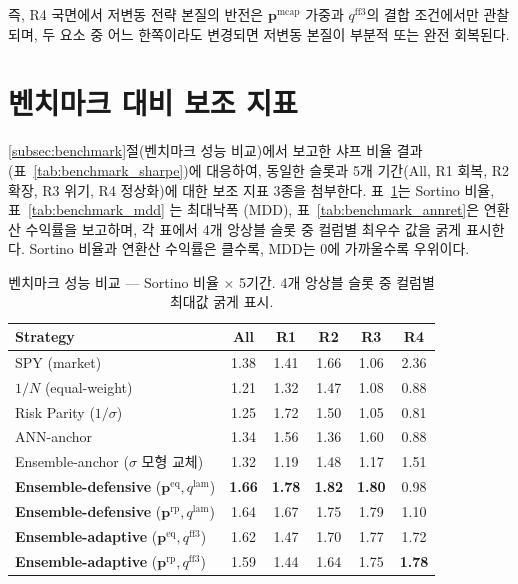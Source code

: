 \documentclass[eng]{kjas3}
\begin{document}
즉, R4 국면에서 저변동 전략 본질의 반전은 $\mathbf{p}^{\mathrm{mcap}}$ 가중과 $q^{\mathrm{ff3}}$의 결합 조건에서만 관찰되며, 두 요소 중 어느 한쪽이라도 변경되면 저변동 본질이 부분적 또는 완전 회복된다.

\section{벤치마크 대비 보조 지표}\label{app:benchmark}

\ref{subsec:benchmark}절(벤치마크 성능 비교)에서 보고한 샤프 비율 결과(표~\ref{tab:benchmark_sharpe})에 대응하여, 동일한 슬롯과 5개 기간(All, R1 회복, R2 확장, R3 위기, R4 정상화)에 대한 보조 지표 3종을 첨부한다.  표~\ref{tab:benchmark_sortino}는 Sortino 비율, 표~\ref{tab:benchmark_mdd} 는 최대낙폭 (MDD), 표~\ref{tab:benchmark_annret}은 연환산 수익률을 보고하며, 각 표에서 4개 앙상블 슬롯 중 컬럼별 최우수 값을 굵게 표시한다. Sortino 비율과 연환산 수익률은 클수록, MDD는 0에 가까울수록 우위이다.

\begin{table}[t]
\centering
\caption{벤치마크 성능 비교 — Sortino 비율 $\times$ 5기간. 4개 앙상블 슬롯 중 컬럼별 최대값 굵게 표시.}
\label{tab:benchmark_sortino}
\setlength{\tabcolsep}{6pt}
\renewcommand{\arraystretch}{1.15}
\small
\begin{tabular}{lccccc}
\toprule
Strategy & All & R1 & R2 & R3 & R4 \\
\midrule
SPY (market)                       & 1.38 & 1.41 & 1.66 & 1.06 & 2.36 \\
$1/N$ (equal-weight)               & 1.21 & 1.32 & 1.47 & 1.08 & 0.88 \\
Risk Parity ($1/\sigma$)           & 1.25 & 1.72 & 1.50 & 1.05 & 0.81 \\
ANN-anchor \citep{pyo2018}         & 1.34 & 1.56 & 1.36 & 1.60 & 0.88 \\
Ensemble-anchor ($\sigma$ 모형 교체) & 1.32 & 1.19 & 1.48 & 1.17 & 1.51 \\
\midrule
\textbf{Ensemble-defensive} ($\mathbf{p}^{\mathrm{eq}}, q^{\mathrm{lam}}$) & \textbf{1.66} & \textbf{1.78} & \textbf{1.82} & \textbf{1.80} & 0.98 \\
\textbf{Ensemble-defensive} ($\mathbf{p}^{\mathrm{rp}}, q^{\mathrm{lam}}$) & 1.64          & 1.67          & 1.75          & 1.79          & 1.10 \\
\textbf{Ensemble-adaptive}  ($\mathbf{p}^{\mathrm{eq}}, q^{\mathrm{ff3}}$) & 1.62          & 1.47          & 1.70          & 1.77          & 1.72 \\
\textbf{Ensemble-adaptive}  ($\mathbf{p}^{\mathrm{rp}}, q^{\mathrm{ff3}}$) & 1.59          & 1.44          & 1.64          & 1.75          & \textbf{1.78} \\
\bottomrule
\end{tabular}
\end{table}
\end{document}
